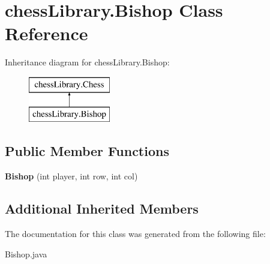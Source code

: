 \hypertarget{classchess_library_1_1_bishop}{}\section{chess\+Library.\+Bishop Class Reference}
\label{classchess_library_1_1_bishop}
Inheritance diagram for chess\+Library.\+Bishop\+:\begin{figure}[H]
\begin{center}
\leavevmode
\includegraphics[height=2.000000cm]{classchess_library_1_1_bishop}
\end{center}
\end{figure}
\subsection*{Public Member Functions}
\begin{DoxyCompactItemize}
\item 
\mbox{\label{classchess_library_1_1_bishop_a9eb76e95488ff2e8e7f17b3c1efc3a16}} 
{\bfseries Bishop} (int player, int row, int col)
\end{DoxyCompactItemize}
\subsection*{Additional Inherited Members}


The documentation for this class was generated from the following file\+:\begin{DoxyCompactItemize}
\item 
Bishop.\+java\end{DoxyCompactItemize}
